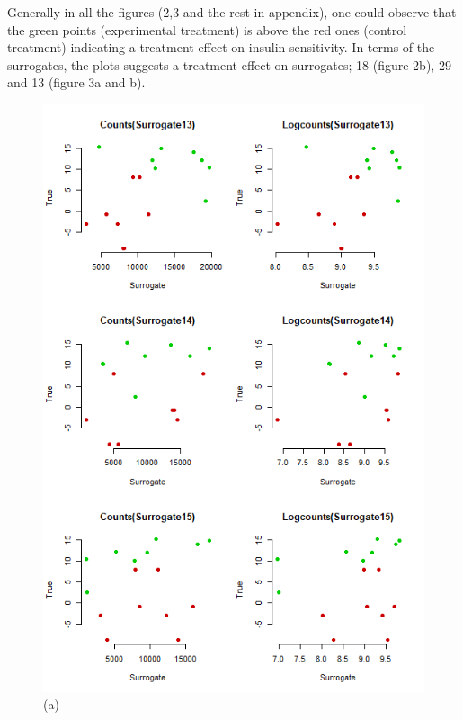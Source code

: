 \documentclass[a4paper,12pt]{article}
\begin{document}
	Generally in all the figures (2,3 and the rest in appendix), one could observe that the green points (experimental treatment) is above the red ones (control treatment) indicating a treatment effect on insulin sensitivity. In terms of the surrogates, the plots suggests a treatment effect on surrogates; 18 (figure 2b), 29 and 13 (figure 3a and b). 
	
	\begin{figure}[H]
		\begin{minipage}{0.5\textwidth}
			\includegraphics[scale=0.5]{exploration-5.png}\\(a)
		\end{minipage}
		\begin{minipage}{0.5\textwidth}

\end{minipage}
\end{figure}
\end{document}
